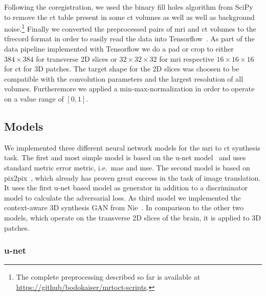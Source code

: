 Following the coregistration, we used the binary fill holes algorithm from
SciPy~\cite{SciPy} to remove the \gls{ct} table present in some \gls{ct}
volumes as well as well as background noise.\footnote{The complete
preprocessing described so far is available at
\url{https://github/bodokaiser/mrtoct-scripts}.} Finally we converted the
preprocessed pairs of \gls{mri} and \gls{ct} volumes to the tfrecord format
in order to easily read the data into Tensorflow~\cite{Tensorflow15}. As part
of the data pipeline implemented with Tensorflow we do a pad or crop to either
$384\times384$ for transverse 2D slices or $32\times32\times32$ for \gls{mri}
respective $16\times16\times16$ for \gls{ct} for 3D patches. The target shape
for the 2D slices was choosen to be compatible with the convolution parameters
and the largest resolution of all volumes. Furtheremore we applied a
min-max-normalization in order to operate on a value range of $[0,1]$.

\subsection{Models}

We implemented three different neural network models for the \gls{mri} to
\gls{ct} synthesis task. The first and most simple model is based on the
u-net model~\cite{Ronneberger15} and uses standard metric error metric,
i.e.\ \gls{mae} and \gls{mse}. The second model is based on
pix2pix~\cite{Isola16}, which already has proven great success in the task
of image translation. It uses the first u-net based model as generator in
addition to a discriminator model to calculate the adversarial loss. As third
model we implemented the context-aware 3D synthesis GAN from Nie~\cite{Nie16}.
In comparison to the other two models, which operate on the transverse 2D
slices of the brain, it is applied to 3D patches.

\subsubsection{u-net}

